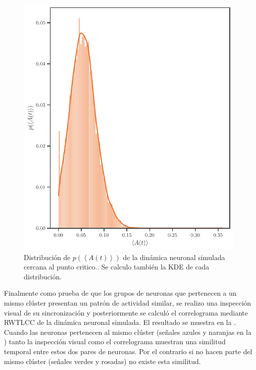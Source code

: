 \begin{figure}[h!]
	\centering\includegraphics[width=\imsize]{fig_distactivos_modelo.pdf}
	\caption[Distribución de $p(\left\langle A(t) \right\rangle)$    de la dinámica neuronal simulada cercana al punto critico.]{Distribución de $p(\left\langle A(t) \right\rangle)$    de la dinámica neuronal simulada cercana al punto critico.. Se calculo también la KDE de cada distribución.} \label{fig:distactivos_exp}
\end{figure}

Finalmente como prueba de que los   grupos de neuronas que pertenecen a un mismo clúster presentan  un patrón de actividad similar, se realizo una  inspección visual de su sincronización y posteriormente se   calculó el correlograma mediante  RWTLCC de la dinámica neuronal simulada.  El resultado se muestra en la .  Cuando las neuronas pertenecen al mismo clúster (señales azules y naranjas en la )  tanto la inspección visual como el correlograma muestran una similitud temporal entre estos dos  pares de neuronas. Por el contrario si no hacen parte del mismo clúster (señales verdes y rosadas)  no  existe esta similitud. 

